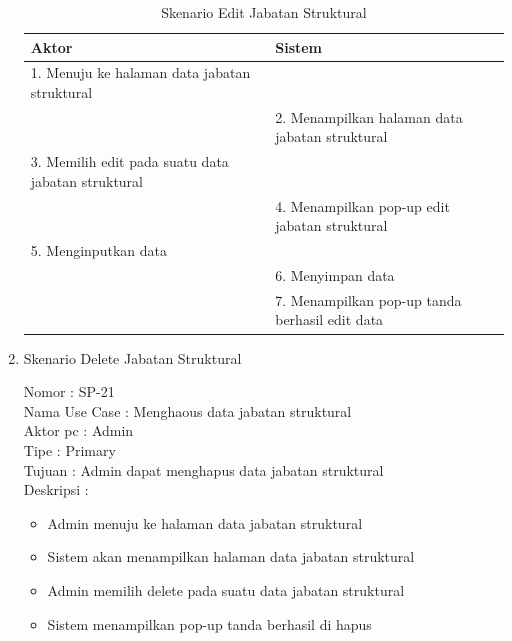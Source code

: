 \begin{enumerate}
\begin{itemize}
\end{itemize}

\begin{table}
	\caption{Skenario Edit Jabatan Struktural}
	\centering
	\begin{tabular}{ |p{55mm} | p{70mm} |}
		\hline 
		\textbf{Aktor} & \textbf{Sistem} \\
		\hline
		
		1.	Menuju ke halaman data jabatan struktural &  \\
		
		\hline
		
		&  2.	Menampilkan halaman data jabatan struktural \\
		
		\hline
		
		3. Memilih edit pada suatu data jabatan struktural & \\
		
		\hline
		
		& 4.	Menampilkan pop-up edit jabatan struktural\\
		
		\hline
		
		5.	Menginputkan data  & \\
		\hline
		
		& 6.	Menyimpan data \\
		\hline
		
		& 7.	Menampilkan pop-up tanda berhasil edit data \\
		\hline
		
	\end{tabular}
\end{table}

\item Skenario Delete Jabatan Struktural

Nomor \kern 3.6pc : SP-21 \\
Nama Use Case : Menghaous data jabatan struktural \\
Aktor  pc : Admin \\
Tipe \kern 4.6pc : Primary \\
Tujuan \kern 3.6pc : Admin dapat menghapus data jabatan struktural\\
Deskripsi \kern 2.5pc : 

\begin{itemize}
	\item Admin menuju ke halaman data jabatan struktural
	\item Sistem akan menampilkan halaman data jabatan struktural
	\item Admin memilih delete pada suatu data jabatan struktural
	\item Sistem menampilkan pop-up tanda berhasil di hapus 
	

\end{itemize}
\end{enumerate}
